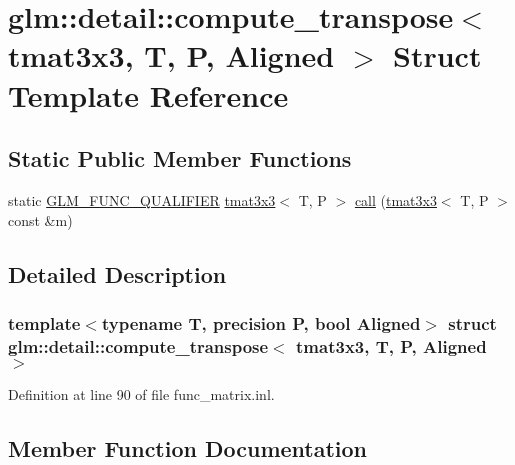 \hypertarget{structglm_1_1detail_1_1compute__transpose_3_01tmat3x3_00_01_t_00_01_p_00_01_aligned_01_4}{}\section{glm\+::detail\+::compute\+\_\+transpose$<$ tmat3x3, T, P, Aligned $>$ Struct Template Reference}
\label{structglm_1_1detail_1_1compute__transpose_3_01tmat3x3_00_01_t_00_01_p_00_01_aligned_01_4}
\subsection*{Static Public Member Functions}
\begin{DoxyCompactItemize}
\item 
static \mbox{\hyperlink{setup_8hpp_a33fdea6f91c5f834105f7415e2a64407}{G\+L\+M\+\_\+\+F\+U\+N\+C\+\_\+\+Q\+U\+A\+L\+I\+F\+I\+ER}} \mbox{\hyperlink{structglm_1_1tmat3x3}{tmat3x3}}$<$ T, P $>$ \mbox{\hyperlink{structglm_1_1detail_1_1compute__transpose_3_01tmat3x3_00_01_t_00_01_p_00_01_aligned_01_4_af13763319f17595e7e84755b881aab95}{call}} (\mbox{\hyperlink{structglm_1_1tmat3x3}{tmat3x3}}$<$ T, P $>$ const \&m)
\end{DoxyCompactItemize}


\subsection{Detailed Description}
\subsubsection*{template$<$typename T, precision P, bool Aligned$>$\newline
struct glm\+::detail\+::compute\+\_\+transpose$<$ tmat3x3, T, P, Aligned $>$}



Definition at line 90 of file func\+\_\+matrix.\+inl.



\subsection{Member Function Documentation}
\mbox{\label{structglm_1_1detail_1_1compute__transpose_3_01tmat3x3_00_01_t_00_01_p_00_01_aligned_01_4_af13763319f17595e7e84755b881aab95}} 
